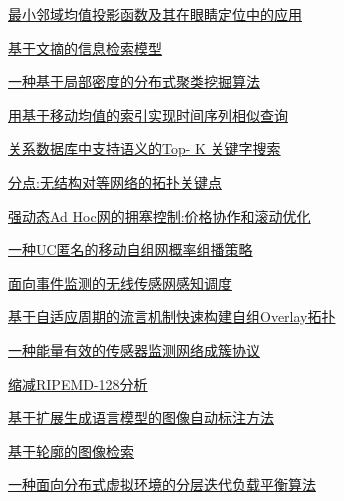 \documentclass[a4paper]{article}
\begin{document}
\href{http://www.jos.org.cn/ch/reader/download_pdf.aspx?file_no=20080914&year_id=2008&quarter_id=9&falg=1}{最小邻域均值投影函数及其在眼睛定位中的应用}

\href{http://www.jos.org.cn/ch/reader/download_pdf.aspx?file_no=20080915&year_id=2008&quarter_id=9&falg=1}{基于文摘的信息检索模型}

\href{http://www.jos.org.cn/ch/reader/download_pdf.aspx?file_no=20080916&year_id=2008&quarter_id=9&falg=1}{一种基于局部密度的分布式聚类挖掘算法}

\href{http://www.jos.org.cn/ch/reader/download_pdf.aspx?file_no=20080917&year_id=2008&quarter_id=9&falg=1}{用基于移动均值的索引实现时间序列相似查询}

\href{http://www.jos.org.cn/ch/reader/download_pdf.aspx?file_no=20080918&year_id=2008&quarter_id=9&falg=1}{关系数据库中支持语义的Top- K 关键字搜索}

\href{http://www.jos.org.cn/ch/reader/download_pdf.aspx?file_no=20080919&year_id=2008&quarter_id=9&falg=1}{分点:无结构对等网络的拓扑关键点}

\href{http://www.jos.org.cn/ch/reader/download_pdf.aspx?file_no=20080920&year_id=2008&quarter_id=9&falg=1}{强动态Ad Hoc网的拥塞控制:价格协作和滚动优化}

\href{http://www.jos.org.cn/ch/reader/download_pdf.aspx?file_no=20080921&year_id=2008&quarter_id=9&falg=1}{一种UC匿名的移动自组网概率组播策略}

\href{http://www.jos.org.cn/ch/reader/download_pdf.aspx?file_no=20080922&year_id=2008&quarter_id=9&falg=1}{面向事件监测的无线传感网感知调度}

\href{http://www.jos.org.cn/ch/reader/download_pdf.aspx?file_no=20080923&year_id=2008&quarter_id=9&falg=1}{基于自适应周期的流言机制快速构建自组Overlay拓扑}

\href{http://www.jos.org.cn/ch/reader/download_pdf.aspx?file_no=20080924&year_id=2008&quarter_id=9&falg=1}{一种能量有效的传感器监测网络成簇协议}

\href{http://www.jos.org.cn/ch/reader/download_pdf.aspx?file_no=20080925&year_id=2008&quarter_id=9&falg=1}{缩减RIPEMD-128分析}

\href{http://www.jos.org.cn/ch/reader/download_pdf.aspx?file_no=20080926&year_id=2008&quarter_id=9&falg=1}{基于扩展生成语言模型的图像自动标注方法}

\href{http://www.jos.org.cn/ch/reader/download_pdf.aspx?file_no=20080927&year_id=2008&quarter_id=9&falg=1}{基于轮廓的图像检索}

\href{http://www.jos.org.cn/ch/reader/download_pdf.aspx?file_no=20080928&year_id=2008&quarter_id=9&falg=1}{一种面向分布式虚拟环境的分层迭代负载平衡算法}
\end{document}
